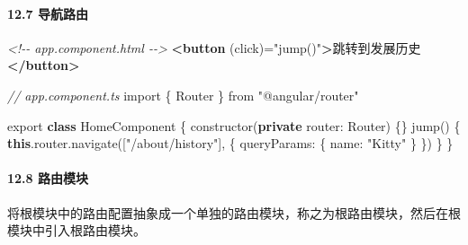 \documentclass[
]{article}
\newenvironment{Shaded}{}{}
\newcommand{\AttributeTok}[1]{\textcolor[rgb]{0.49,0.56,0.16}{#1}}
\newcommand{\CommentTok}[1]{\textcolor[rgb]{0.38,0.63,0.69}{\textit{#1}}}
\newcommand{\DataTypeTok}[1]{\textcolor[rgb]{0.56,0.13,0.00}{#1}}
\newcommand{\FunctionTok}[1]{\textcolor[rgb]{0.02,0.16,0.49}{#1}}
\newcommand{\ImportTok}[1]{#1}
\newcommand{\KeywordTok}[1]{\textcolor[rgb]{0.00,0.44,0.13}{\textbf{#1}}}
\newcommand{\NormalTok}[1]{#1}
\newcommand{\OperatorTok}[1]{\textcolor[rgb]{0.40,0.40,0.40}{#1}}
\newcommand{\OtherTok}[1]{\textcolor[rgb]{0.00,0.44,0.13}{#1}}
\newcommand{\StringTok}[1]{\textcolor[rgb]{0.25,0.44,0.63}{#1}}
\begin{document}
\hypertarget{127-ux5bfcux822aux8defux7531}{%
\paragraph{12.7 导航路由}\label{127-ux5bfcux822aux8defux7531}}

\begin{Shaded}
\begin{Highlighting}[]
\CommentTok{\textless{}!{-}{-} app.component.html {-}{-}\textgreater{}}
 \KeywordTok{\textless{}button}\OtherTok{ (click)=}\StringTok{"jump()"}\KeywordTok{\textgreater{}}\NormalTok{跳转到发展历史}\KeywordTok{\textless{}/button\textgreater{}}
\end{Highlighting}
\end{Shaded}

\begin{Shaded}
\begin{Highlighting}[]
\CommentTok{// app.component.ts}
\ImportTok{import}\NormalTok{ \{ Router \} }\ImportTok{from} \StringTok{"@angular/router"}

\ImportTok{export} \KeywordTok{class}\NormalTok{ HomeComponent \{}
  \FunctionTok{constructor}\NormalTok{(}\KeywordTok{private} \DataTypeTok{router}\OperatorTok{:}\NormalTok{ Router) \{\}}
  \FunctionTok{jump}\NormalTok{() \{}
    \KeywordTok{this}\OperatorTok{.}\AttributeTok{router}\OperatorTok{.}\FunctionTok{navigate}\NormalTok{([}\StringTok{"/about/history"}\NormalTok{]}\OperatorTok{,}\NormalTok{ \{}
      \DataTypeTok{queryParams}\OperatorTok{:}\NormalTok{ \{}
        \DataTypeTok{name}\OperatorTok{:} \StringTok{"Kitty"}
\NormalTok{      \}}
\NormalTok{    \})}
\NormalTok{  \}}
\NormalTok{\}}
\end{Highlighting}
\end{Shaded}

\hypertarget{128-ux8defux7531ux6a21ux5757}{%
\paragraph{12.8 路由模块}\label{128-ux8defux7531ux6a21ux5757}}

将根模块中的路由配置抽象成一个单独的路由模块，称之为根路由模块，然后在根模块中引入根路由模块。
\end{document}
